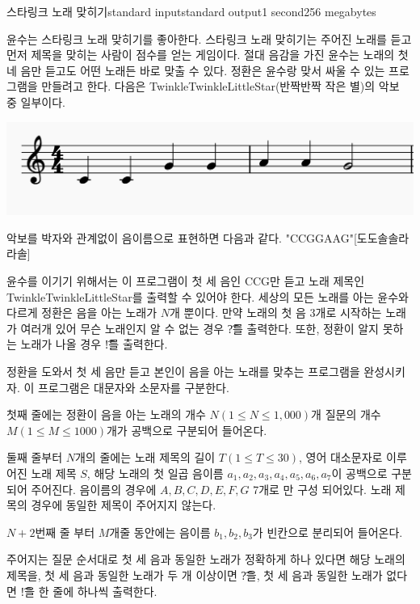 \begin{problem}{스타링크 노래 맞히기}{standard input}{standard output}{1 second}{256 megabytes}

윤수는 스타링크 노래 맞히기를 좋아한다. 스타링크 노래 맞히기는 주어진 노래를 듣고 먼저 제목을 맞히는 사람이 점수를 얻는 게임이다. 절대 음감을 가진 윤수는 노래의 첫 네 음만 듣고도 어떤 노래든 바로 맞출 수 있다. 정환은 윤수랑 맞서 싸울 수 있는 프로그램을 만들려고 한다. 다음은 TwinkleTwinkleLittleStar(반짝반짝 작은 별)의 악보 중 일부이다.
\begin{center}
\includegraphics[bb=0 0 100 200]{starlink.png}
\end{center} 

악보를 박자와 관계없이 음이름으로 표현하면 다음과 같다. "CCGGAAG"[도도솔솔라라솔]

윤수를 이기기 위해서는 이 프로그램이 첫 세 음인 CCG만 듣고 노래 제목인 TwinkleTwinkleLittleStar를 출력할 수 있어야 한다. 세상의 모든 노래를 아는 윤수와 다르게 정환은 음을 아는 노래가 $N$개 뿐이다. 만약 노래의 첫 음 3개로 시작하는 노래가 여러개 있어 무슨 노래인지 알 수 없는 경우 \t{?}를 출력한다. 또한, 정환이 알지 못하는 노래가 나올 경우 \t{!}를 출력한다.

정환을 도와서 첫 세 음만 듣고 본인이 음을 아는 노래를 맞추는 프로그램을 완성시키자. 이 프로그램은 대문자와 소문자를 구분한다.

\InputFile
첫째 줄에는 정환이 음을 아는 노래의 개수 $N(1 ≤ N ≤ 1,000)$개 질문의 개수 $M(1 ≤ M ≤ 1000)$개가 공백으로 구분되어 들어온다.

둘째 줄부터 $N$개의 줄에는 노래 제목의 길이 $T(1 ≤ T ≤ 30)$, 영어 대소문자로 이루어진 노래 제목 $S$, 해당 노래의 첫 일곱 음이름 $a_1, a_2, a_3, a_4, a_5, a_6, a_7$이 공백으로 구분되어 주어진다. 음이름의 경우에 $A, B, C, D, E, F, G$ 7개로 만 구성 되어있다. 노래 제목의 경우에 동일한 제목이 주어지지 않는다.

$N+2$번째 줄 부터 $M$개줄 동안에는 음이름 $b_1, b_2, b_3$가 빈칸으로 분리되어 들어온다.

\OutputFile
주어지는 질문 순서대로 첫 세 음과 동일한 노래가 정확하게 하나 있다면 해당 노래의 제목을, 첫 세 음과 동일한 노래가 두 개 이상이면 \t{?}을, 첫 세 음과 동일한 노래가 없다면 \t{!}을 한 줄에 하나씩 출력한다.

\Example

\begin{example}
%
\end{example}

\end{problem}

